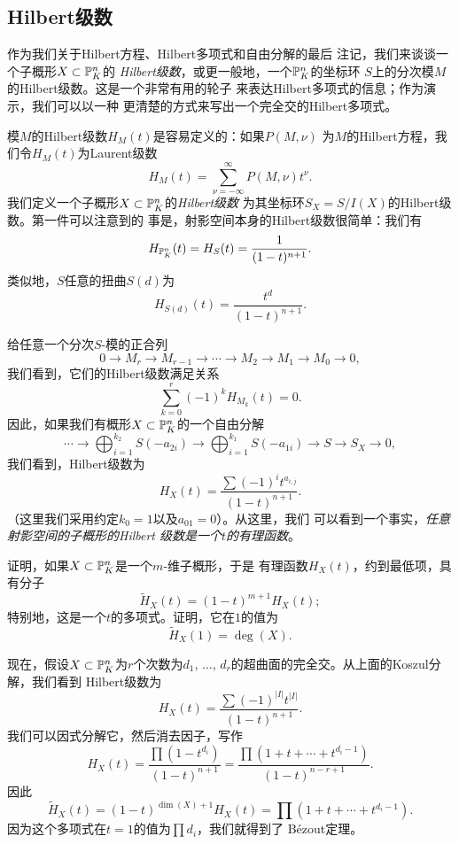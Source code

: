 \subsection{Hilbert级数}\label{s:3.3.6}

作为我们关于Hilbert方程、Hilbert多项式和自由分解的最后
注记，我们来谈谈一个子概形$X\subset \P_K^n$的
\textit{Hilbert级数}，或更一般地，一个$\P_K^n$的坐标环
$S$上的分次模$M$的Hilbert级数。这是一个非常有用的轮子
来表达Hilbert多项式的信息；作为演示，我们可以以一种
更清楚的方式来写出一个完全交的Hilbert多项式。

模$M$的Hilbert级数$H_M(t)$是容易定义的：如果$P(M,\nu)$
为$M$的Hilbert方程，我们令$H_M(t)$为Laurent级数
\[
	H_M(t)=\sum_{\nu=-\infty}^\infty P(M,\nu)t^\nu.
\]
我们定义一个子概形$X\subset \P_K^n$的\textit{Hilbert级数}
为其坐标环$S_X=S/I(X)$的Hilbert级数。第一件可以注意到的
事是，射影空间本身的Hilbert级数很简单：我们有
\[
	H_{\P^n_K}(t)=H_S(t)=\frac{1}{(1-t)^{n+1}}.
\]
类似地，$S$任意的扭曲$S(d)$为
\[
	H_{S(d)}(t)=\frac{t^d}{(1-t)^{n+1}}.
\]

给任意一个分次$S$-模的正合列
\[
	0\longrightarrow M_r\longrightarrow M_{r-1}
	\longrightarrow \cdots \longrightarrow M_2
	\longrightarrow M_1 \longrightarrow M_0
	\longrightarrow 0,
\]
我们看到，它们的Hilbert级数满足关系
\[
	\sum_{k=0}^r(-1)^k H_{M_k}(t)=0.
\]
因此，如果我们有概形$X\subset \P_K^n$的一个自由分解
\[
	\cdots \longrightarrow \bigoplus_{i=1}^{k_2}
	S(-a_{2i})\longrightarrow \bigoplus_{i=1}^{k_1}
	S(-a_{1i})\longrightarrow S\longrightarrow S_X
	\longrightarrow 0,
\]
我们看到，Hilbert级数为
\[
	H_X(t)=\frac{\sum (-1)^i t^{a_{i,j}}}{(1-t)^{n+1}}.
\]%
（这里我们采用约定$k_0=1$以及$a_{01}=0$）。从这里，我们
可以看到一个事实，\textit{任意射影空间的子概形的Hilbert
级数是一个$t$的有理函数}。

\begin{exe}\label{exe:3.83}
	证明，如果$X\subset \P_K^n$是一个$m$-维子概形，于是
	有理函数$H_X(t)$，约到最低项，具有分子
	\[
		\tilde{H}_X(t)=(1-t)^{m+1}H_X(t);
	\]
	特别地，这是一个$t$的多项式。证明，它在$1$的值为
	\[
		\tilde{H}_X(1)=\deg(X).
	\]
\end{exe}

现在，假设$X\subset \P_K^n$为$r$个次数为$d_1$, $\dots$, 
$d_r$的超曲面的完全交。从上面的Koszul分解，我们看到
Hilbert级数为
\[
	H_X(t)=\frac{\sum (-1)^{|I|}t^{|I|}}{(1-t)^{n+1}}.
\]
我们可以因式分解它，然后消去因子，写作
\[
	H_X(t)=\frac{\prod (1-t^{d_i})}{(1-t)^{n+1}}
	=\frac{\prod (1+t+\cdots+t^{d_{i}-1})}{(1-t)^{n-r+1}}.
\]
因此
\[
	\tilde{H}_X(t)=(1-t)^{\dim(X)+1}H_X(t)=
	\prod (1+t+\cdots+t^{d_{i}-1}).
\]
因为这个多项式在$t=1$的值为$\prod d_i$，我们就得到了
B\'ezout定理。
